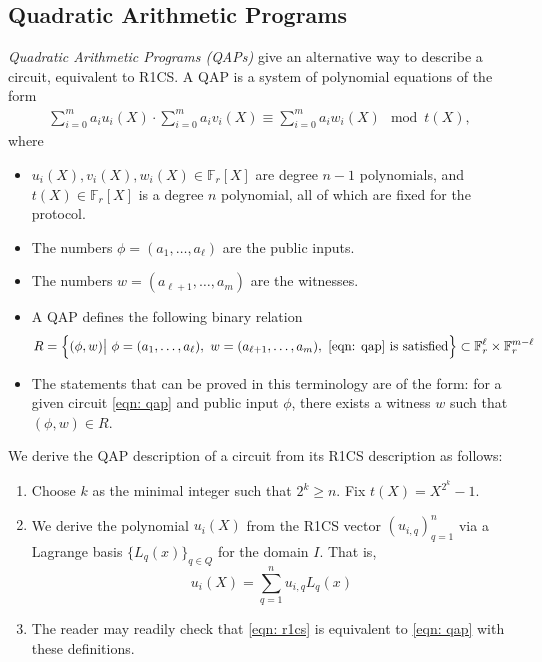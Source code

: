 \subsection{Quadratic Arithmetic Programs}
\emph{Quadratic Arithmetic Programs (QAPs)} give an alternative way to describe a circuit, equivalent to R1CS. A QAP is a system of polynomial equations of the form
\begin{align}
\sum_{i=0}^m a_i u_i(X) \cdot \sum_{i=0}^m a_i v_i(X) \equiv \sum_{i=0}^m a_i w_i(X) \mod t(X), \label{eqn: qap}
\end{align}
where 
\begin{itemize}
\item $u_i(X), v_i(X), w_i(X) \in \mathbb{F}_r[X]$ are degree $n-1$ polynomials, and $t(X) \in \mathbb{F}_r[X]$ is a degree $n$ polynomial, all of which are fixed for the protocol.
\item The numbers $\phi = (a_1, \dots, a_\ell)$ are the public inputs.
\item The numbers $w = (a_{\ell + 1}, \dots, a_m)$ are the witnesses.
\item A QAP defines the following binary relation
\begin{align}
R = \left\{ (\phi, w) \big| \ \phi = (a_1, \dots, a_\ell), \ w = (a_{\ell + 1}, \dots, a_m), \ \eqref{eqn: qap} \textrm{ is satisfied} \right\} \subset \mathbb{F}_r^\ell \times \mathbb{F}_r^{m-\ell}
\end{align}
\item The statements that can be proved in this terminology are of the form: for a given circuit \eqref{eqn: qap} and public input $\phi$, there exists a witness $w$ such that $(\phi, w) \in R$.
\end{itemize}

We derive the QAP description of a circuit from its R1CS description as follows:
\begin{enumerate}
    \item Choose $k$ as the minimal integer such that $2^k \geq n$. Fix $t(X) = X^{2^k} - 1$.
    \item We derive the polynomial $u_i(X)$ from the R1CS vector $(u_{i,q})_{q=1}^n$ via a Lagrange basis $\{ L_q(x) \}_{q \in Q}$ for the domain $I$.  That is,
    \begin{equation}
        u_i(X) = \sum_{q=1}^n u_{i,q} L_q(x) 
    \end{equation}
    \item The reader may readily check that \eqref{eqn: r1cs} is equivalent to \eqref{eqn: qap} with these definitions.
\end{enumerate}


